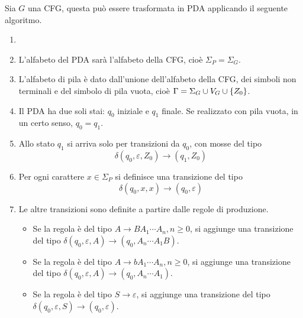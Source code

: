 \documentclass{subfiles}
\begin{document}
Sia \(G\) una CFG, questa può essere trasformata in PDA applicando il seguente algoritmo.
\begin{Algorithm*}
    \begin{enumerate}
        \item []
        \item L'alfabeto del PDA sarà l'alfabeto della CFG, cioè \(\Sigma_{P} = \Sigma_{G}\).
        \item L'alfabeto di pila è dato dall'unione dell'alfabeto della CFG, dei simboli non terminali e del simbolo di pila vuota, cioè \(\Gamma = \Sigma_{G} \cup V_{G} \cup \left\{Z_{0}\right\}\).
        \item Il PDA ha due soli stai: \(q_{0}\) iniziale e \(q_{1}\) finale. Se realizzato con pila vuota, in un certo senso, \(q_{0} = q_{1}\).
        \item Allo stato \(q_{1}\) si arriva solo per transizioni da \(q_{0}\), con mosse del tipo
              \[
                  \delta(q_{0}, \varepsilon, Z_{0}) \to (q_{1}, Z_{0})
              \]
        \item Per ogni carattere \(x \in \Sigma_{P}\) si definisce una transizione del tipo
              \[
                  \delta(q_{0}, x, x) \to (q_{0}, \varepsilon)
              \]
        \item Le altre transizioni sono definite a partire dalle regole di produzione.
              \begin{itemize}
                  \item Se la regola è del tipo \(A \to BA_{1} \cdots A_{n}, n \ge 0\), si aggiunge una transizione del tipo \(\delta(q_{0}, \varepsilon, A) \to (q_{0}, A_{n} \cdots A_{1}B)\).
                  \item Se la regola è del tipo \(A \to bA_{1} \cdots A_{n}, n \ge 0\), si aggiunge una transizione del tipo \(\delta(q_{0}, \varepsilon, A) \to (q_{0}, A_{n} \cdots A_{1})\).
                  \item Se la regola è del tipo \(S \to \varepsilon \), si aggiunge una transizione del tipo \(\delta(q_{0}, \varepsilon, S) \to (q_{0}, \varepsilon)\).
              \end{itemize}
    \end{enumerate}
\end{Algorithm*}
\clearpage
\end{document}

